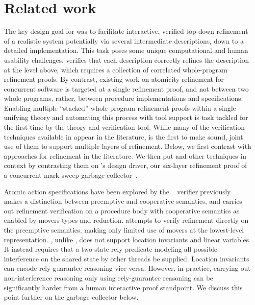 
\section{Related work}
\label{sec:related}

The key design goal for \civl was to facilitate interactive, verified top-down refinement
of a realistic system potentially via several intermediate
descriptions, down to a detailed implementation.  
This task poses some unique computational and human usability challenges. 
\civl verifies that each description correctly refines the description
at the level above, which requires a collection of correlated
whole-program refinement proofs. 
By contrast, existing work on atomicity refinement for concurrent software is
targeted at a single refinement proof, and not between two whole
programs, rather, between procedure implementations and
specifications. 
Enabling multiple ``stacked'' whole-program refinement proofs
within a single unifying theory and automating this process with tool support is task tackled for the first time by the
\civl theory and verification tool. 
While many of the verification techniques available in \civl appear in
the literature, \civl is the first to make sound, joint use of them to
support multiple layers of refinement. 
Below, we first contrast \civl with approaches for 
refinement in the literature. 
We then put \civl and other techniques in context by contrasting them
on \civl's design driver, our six-layer refinement proof of a
concurrent mark-sweep garbage collector~\cite{gc-techreport}.

Atomic action specifications have been explored by the
\calvin~\cite{FlanaganFQS05,FreundQ04} verifier previously. 
\civl makes a distinction between preemptive and cooperative
semantics, and carries out refinement verification on a procedure body
with cooperative semantics as enabled by movers types and reduction.
\calvin attempts to verify refinement directly on the preemptive
semantics, making only limited use of movers at the lowest-level
representation. 
\calvin, unlike \civl, does not support location invariants and linear
variables. 
It instead requires that a two-state rely predicate modeling all possible
interference on the shared state by other threads be supplied. 
Location invariants can encode rely-guarantee reasoning vice versa. 
However, in practice, carrying out non-interference reasoning only
using rely-guarantee reasoning can be significantly harder from a
human interactive proof standpoint. We discuss this point further on
the garbage collector below. 

